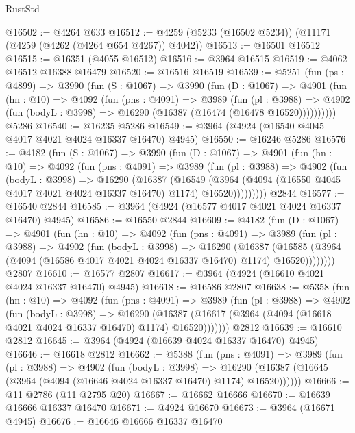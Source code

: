 \begin{lexlean}{RustStd}
\begin{coremodule}
{\begin{coremodule}
{{{{{{{{{{{{{{{{{{{{{{{{{{{{{{{{{{{{{{@16502 := @4264 @633
@16512 := @4259 (@5233 (@16502 @5234)) (@11171 (@4259 (@4262 (@4264 @654 @4267)) @4042))
@16513 := @16501 @16512
@16515 := @16351 (@4055 @16512)
@16516 := @3964 @16515
@16519 := @4062 @16512 @16388 @16479
@16520 := @16516 @16519
@16539 := @5251
    (fun (ps : @4899) =>
    @3990
      (fun (S : @1067) =>
      @3990
        (fun (D : @1067) =>
        @4901
          (fun (hn : @10) =>
          @4092
            (fun (pns : @4091) =>
            @3989
              (fun (pl : @3988) =>
              @4902 (fun (bodyL : @3998) => @16290 (@16387 (@16474 (@16478 @16520))))))))))
    @5286
@16540 := @16235 @5286
@16549 := @3964 (@4924 (@16540 @4045 @4017 @4021 @4024 @16337 @16470) @4945)
@16550 := @16246 @5286
@16576 := @4182
    (fun (S : @1067) =>
    @3990
      (fun (D : @1067) =>
      @4901
        (fun (hn : @10) =>
        @4092
          (fun (pns : @4091) =>
          @3989
            (fun (pl : @3988) =>
            @4902
              (fun (bodyL : @3998) =>
              @16290
                (@16387
                  (@16549
                    (@3964
                      (@4094 (@16550 @4045 @4017 @4021 @4024 @16337 @16470) @1174)
                      @16520)))))))))
    @2844
@16577 := @16540 @2844
@16585 := @3964 (@4924 (@16577 @4017 @4021 @4024 @16337 @16470) @4945)
@16586 := @16550 @2844
@16609 := @4182
    (fun (D : @1067) =>
    @4901
      (fun (hn : @10) =>
      @4092
        (fun (pns : @4091) =>
        @3989
          (fun (pl : @3988) =>
          @4902
            (fun (bodyL : @3998) =>
            @16290
              (@16387
                (@16585 (@3964 (@4094 (@16586 @4017 @4021 @4024 @16337 @16470) @1174) @16520))))))))
    @2807
@16610 := @16577 @2807
@16617 := @3964 (@4924 (@16610 @4021 @4024 @16337 @16470) @4945)
@16618 := @16586 @2807
@16638 := @5358
    (fun (hn : @10) =>
    @4092
      (fun (pns : @4091) =>
      @3989
        (fun (pl : @3988) =>
        @4902
          (fun (bodyL : @3998) =>
          @16290
            (@16387 (@16617 (@3964 (@4094 (@16618 @4021 @4024 @16337 @16470) @1174) @16520)))))))
    @2812
@16639 := @16610 @2812
@16645 := @3964 (@4924 (@16639 @4024 @16337 @16470) @4945)
@16646 := @16618 @2812
@16662 := @5388
    (fun (pns : @4091) =>
    @3989
      (fun (pl : @3988) =>
      @4902
        (fun (bodyL : @3998) =>
        @16290 (@16387 (@16645 (@3964 (@4094 (@16646 @4024 @16337 @16470) @1174) @16520))))))
@16666 := @11 @2786 (@11 @2795 @20)
@16667 := @16662 @16666
@16670 := @16639 @16666 @16337 @16470
@16671 := @4924 @16670
@16673 := @3964 (@16671 @4945)
@16676 := @16646 @16666 @16337 @16470
}}}}}}}}}}}}}}}}}}}}}}}}}}}}}}}}}}}}}}
\end{coremodule}}
\end{coremodule}
\end{lexlean}
